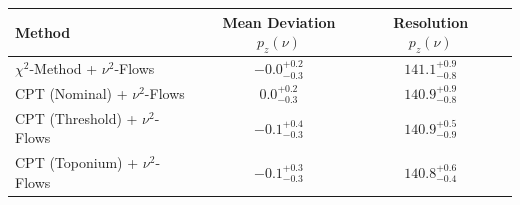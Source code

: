     \begin{tabular}{lccc}
        \toprule
        Method & Mean Deviation $p_{z}(\nu)$ & Resolution $p_{z}(\nu)$ \\
        \midrule
        $\chi^2$-Method + $\nu^2$-Flows & $-0.0^{+0.2}_{-0.3}$ & $141.1^{+0.9}_{-0.8}$ \\
        CPT (Nominal) + $\nu^2$-Flows & $0.0^{+0.2}_{-0.3}$ & $140.9^{+0.9}_{-0.8}$ \\
        CPT (Threshold) + $\nu^2$-Flows & $-0.1^{+0.4}_{-0.3}$ & $140.9^{+0.5}_{-0.9}$ \\
        CPT (Toponium) + $\nu^2$-Flows & $-0.1^{+0.3}_{-0.3}$ & $140.8^{+0.6}_{-0.4}$ \\
        \bottomrule
    \end{tabular}